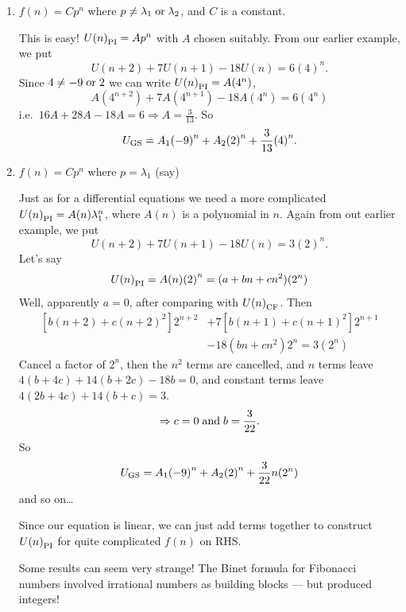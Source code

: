 \documentclass[12pt]{report}
\theoremstyle{definition}
\begin{document}
\begin{enumerate}[label = (\alph*)]
    \item $f(n) = Cp^{n}$ where $p \neq \lambda_1 \;\textnormal{or}\; \lambda_2$, and $C$ is a constant.
        
        This is easy! ${U(n)}_{\textnormal{PI}} = Ap^{n}$ with $A$ chosen suitably.
        From our earlier example, we put\[
            U(n + 2) + 7U(n + 1) - 18U(n) = 6{(4)}^{n}.
            \]Since $4 \neq -9 \;\textnormal{or}\; 2$ we can write ${U(n)}_{\textnormal{PI}} = A (4^n)$,\[
        A (4^{n + 2}) + 7A (4^{n + 1}) - 18A (4^{n}) = 6 (4^{n})
        \]i.e.\ $16A + 28A - 18A = 6 \Rightarrow{} A = \frac{3}{13}$.
        So \[
            U_{\textnormal{GS}} = A_1 {(-9)}^{n} + A_2 {(2)}^{n} + \frac{3}{13} {(4)}^{n}.
        \]

    \item $f(n) = Cp^{n}$ where $p = \lambda_1$ (say)

        Just as for a differential equations we need a more complicated 
        ${U(n)}_{\textnormal{PI}} = A(n) \lambda_1^{n}$, where $A(n)$ is a polynomial in $n$.
        Again from out earlier example, we put\[
            U(n + 2) + 7U(n + 1) - 18U(n) = 3{(2)}^{n}.
        \]Let's say\[
        {U(n)}_{\textnormal{PI}} = A(n){(2)}^{n} = (a + bn + cn^{2})(2^{n})
        \]
        Well, apparently $a = 0$, after comparing with ${U(n)}_{\textnormal{CF}}$.
        Then \[
            \begin{align*}
                [b(n+2) + c{(n+2)}^{2}]2^{n+2} & + 7[b(n+1) + c{(n+1)}^{2}]2^{n+1} \\
                                               & - 18(bn + cn^{2})2^{n} = 3(2^{n})
            \end{align*}
        \]
        Cancel a factor of $2^{n}$, then the $n^{2}$ terms are cancelled, and
        $n$ terms leave $4(b+4c) + 14(b+2c) - 18b = 0$, and constant terms leave
        $4(2b + 4c) + 14(b+c) = 3$. \[
            \Rightarrow{} c = 0 \;\textnormal{and}\; b = \frac{3}{22}.
        \]
        So\[
            U_{\textnormal{GS}} = A_1 {(-9)}^{n} + A_2 {(2)}^{n} + \frac{3}{22}n (2^{n})
        \]and so on\ldots

        Since our equation is linear, we can just add terms together to construct 
        ${U(n)}_{\textnormal{PI}}$ for quite complicated $f(n)$ on RHS.\@

        Some results can seem very strange! The Binet formula for Fibonacci numbers
        involved irrational numbers as building blocks --- but produced integers!
        

\end{enumerate}
\end{document}
